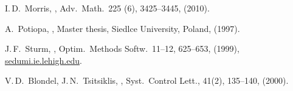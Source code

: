 \begin{thebibliography}{}
    I.\,D.~Morris,
    ,
    \newblock Adv.\ Math.\, 225 (6), 3425--3445, (2010).
    
    A.~Potiopa,
    ,
    \newblock Master thesis, Siedlce University, Poland, (1997).

    J.\,F.~Sturm,
    ,
    \newblock Optim.\ Methods Softw.\, 11--12, 625--653, (1999),
    \href{http://sedumi.ie.lehigh.edu/?page_id=58}{sedumi.ie.lehigh.edu}.
    
    V.\,D.~Blondel, J.\,N.~Tsitsiklis,
    ,
    \newblock Syst.\ Control Lett., 41(2), 135--140, (2000).
    
    
\end{thebibliography}

